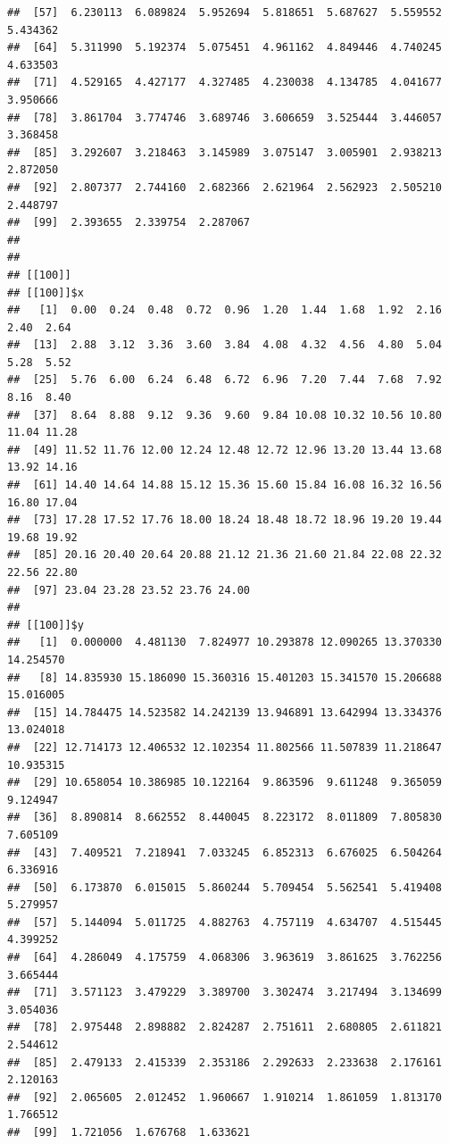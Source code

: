 \documentclass[
  ignorenonframetext,
]{beamer}
\begin{document}
\begin{frame}[fragile]{}
\begin{verbatim}
##  [57]  6.230113  6.089824  5.952694  5.818651  5.687627  5.559552  5.434362
##  [64]  5.311990  5.192374  5.075451  4.961162  4.849446  4.740245  4.633503
##  [71]  4.529165  4.427177  4.327485  4.230038  4.134785  4.041677  3.950666
##  [78]  3.861704  3.774746  3.689746  3.606659  3.525444  3.446057  3.368458
##  [85]  3.292607  3.218463  3.145989  3.075147  3.005901  2.938213  2.872050
##  [92]  2.807377  2.744160  2.682366  2.621964  2.562923  2.505210  2.448797
##  [99]  2.393655  2.339754  2.287067
## 
## 
## [[100]]
## [[100]]$x
##   [1]  0.00  0.24  0.48  0.72  0.96  1.20  1.44  1.68  1.92  2.16  2.40  2.64
##  [13]  2.88  3.12  3.36  3.60  3.84  4.08  4.32  4.56  4.80  5.04  5.28  5.52
##  [25]  5.76  6.00  6.24  6.48  6.72  6.96  7.20  7.44  7.68  7.92  8.16  8.40
##  [37]  8.64  8.88  9.12  9.36  9.60  9.84 10.08 10.32 10.56 10.80 11.04 11.28
##  [49] 11.52 11.76 12.00 12.24 12.48 12.72 12.96 13.20 13.44 13.68 13.92 14.16
##  [61] 14.40 14.64 14.88 15.12 15.36 15.60 15.84 16.08 16.32 16.56 16.80 17.04
##  [73] 17.28 17.52 17.76 18.00 18.24 18.48 18.72 18.96 19.20 19.44 19.68 19.92
##  [85] 20.16 20.40 20.64 20.88 21.12 21.36 21.60 21.84 22.08 22.32 22.56 22.80
##  [97] 23.04 23.28 23.52 23.76 24.00
## 
## [[100]]$y
##   [1]  0.000000  4.481130  7.824977 10.293878 12.090265 13.370330 14.254570
##   [8] 14.835930 15.186090 15.360316 15.401203 15.341570 15.206688 15.016005
##  [15] 14.784475 14.523582 14.242139 13.946891 13.642994 13.334376 13.024018
##  [22] 12.714173 12.406532 12.102354 11.802566 11.507839 11.218647 10.935315
##  [29] 10.658054 10.386985 10.122164  9.863596  9.611248  9.365059  9.124947
##  [36]  8.890814  8.662552  8.440045  8.223172  8.011809  7.805830  7.605109
##  [43]  7.409521  7.218941  7.033245  6.852313  6.676025  6.504264  6.336916
##  [50]  6.173870  6.015015  5.860244  5.709454  5.562541  5.419408  5.279957
##  [57]  5.144094  5.011725  4.882763  4.757119  4.634707  4.515445  4.399252
##  [64]  4.286049  4.175759  4.068306  3.963619  3.861625  3.762256  3.665444
##  [71]  3.571123  3.479229  3.389700  3.302474  3.217494  3.134699  3.054036
##  [78]  2.975448  2.898882  2.824287  2.751611  2.680805  2.611821  2.544612
##  [85]  2.479133  2.415339  2.353186  2.292633  2.233638  2.176161  2.120163
##  [92]  2.065605  2.012452  1.960667  1.910214  1.861059  1.813170  1.766512
##  [99]  1.721056  1.676768  1.633621
\end{verbatim}
\end{frame}
\end{document}
